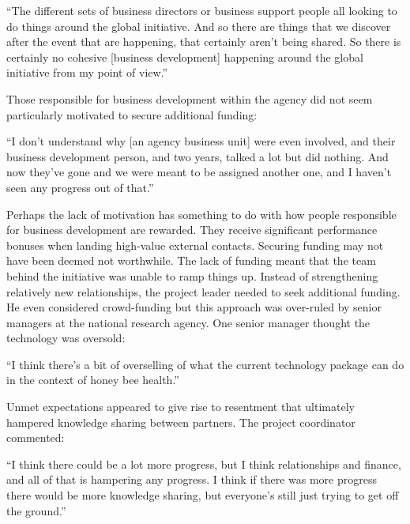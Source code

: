 \begin{displayquote}[Participant 22/3]
\small
\enquote{The different sets of business directors or business support people all looking to do things around the global initiative. And so there are things that we discover after the event that are happening, that certainly aren't being shared. So there is certainly no cohesive [business development] happening around the global initiative from my point of view.} 
\end{displayquote}

Those responsible for business development within the agency did not seem particularly motivated to secure additional funding:

\begin{displayquote}[Participant 13/3]
\small
\enquote{I don't understand why [an agency business unit] were even involved, and their business development person, and two years, talked a lot but did nothing. And now they've gone and we were meant to be assigned another one, and I haven't seen any progress out of that.} 
\end{displayquote}
 
Perhaps the lack of motivation has something to do with how people responsible for business development are rewarded. They receive significant performance bonuses when landing high-value external contacts. Securing funding may not have been deemed not worthwhile. The lack of funding meant that the team behind the initiative was unable to ramp things up. Instead of strengthening relatively new relationships, the project leader needed to seek additional funding. He even considered crowd-funding but this approach was over-ruled by senior managers at the national research agency. One senior manager thought the technology was oversold:

 \begin{displayquote}[Participant 22/3]
\small
\enquote{I think there’s a bit of overselling of what the current technology package can do in the context of honey bee health.} 
\end{displayquote}
 
 Unmet expectations appeared to give rise to resentment that ultimately hampered knowledge sharing between partners. The project coordinator commented:

\begin{displayquote}[Participant 13/3]
\small
\enquote{I think there could be a lot more progress, but I think relationships and finance, and all of that is hampering any progress. I think if there was more progress there would be more knowledge sharing, but everyone's still just trying to get off the ground.} 
\end{displayquote}

